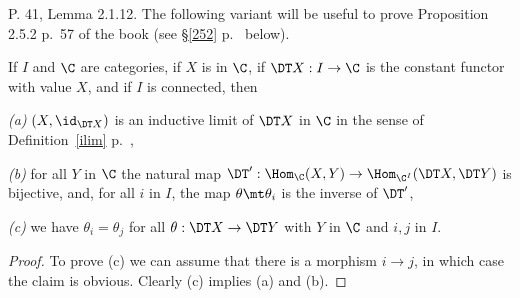 \documentclass[12pt]{article}
\theoremstyle{remark}
\theoremstyle{definition}
\begin{document}
%

\begin{s}
P. 41, Lemma 2.1.12. The following variant will be useful to prove Proposition 2.5.2 p.~57 of the book (see \S\ref{252} p.~ below).

\begin{lem}
If $I$ and $\C$ are categories, if $X$ is in $\C$, if $\DT X:I\to\C$ is the constant functor with value $X$, and if $I$ is connected, then 

\nn\emph{(a)} $(X,\id_{\DT X})$ is an inductive limit of $\DT X$ in $\C$ in the sense of Definition~\ref{ilim} p.~,

\nn\emph{(b)} for all $Y$ in $\C$ the natural map $\DT':\Hom_\C(X,Y)\to\Hom_{\C^I}(\DT X,\DT Y)$ is bijective, and, for all $i$ in $I$, the map $\theta\mt\theta_i$ is the inverse of $\DT'$,

\nn\emph{(c)} we have $\theta_i=\theta_j$ for all $\theta:\DT X\to\DT Y$ with $Y$ in $\C$ and $i,j$ in $I$.
\end{lem}

\begin{proof}
To prove (c) we can assume that there is a morphism $i\to j$, in which case the claim is obvious. Clearly (c) implies (a) and (b).
\end{proof}
\end{s}

%
\end{document}
